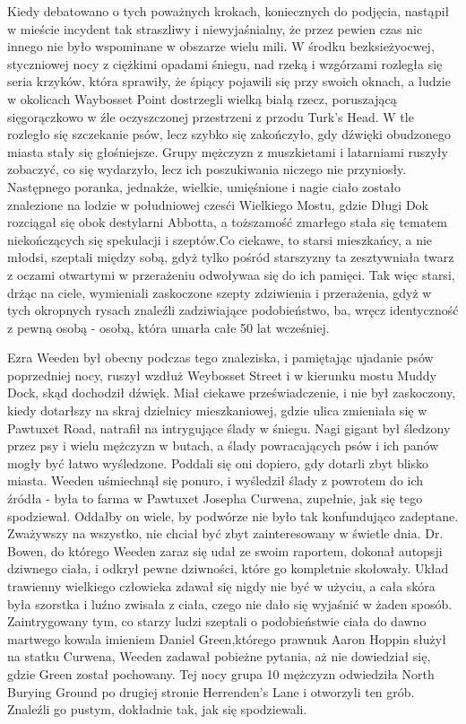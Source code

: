 Kiedy debatowano o tych poważnych krokach, koniecznych do podjęcia, nastąpił w mieście incydent tak straszliwy i niewyjaśnialny, że przez pewien czas nic innego nie było wspominane w obszarze wielu mili. W środku bezksieżyocwej, styczniowej nocy z ciężkimi opadami śniegu, nad rzeką i wzgórzami rozległa się seria krzyków, która sprawiły, że śpiący pojawili się przy swoich oknach, a ludzie w okolicach Waybosset Point dostrzegli wielką białą rzecz, poruszającą sięgorączkowo w źle oczyszczonej przestrzeni z przodu Turk's Head. W tle rozległo się szczekanie psów, lecz szybko się zakończyło, gdy dźwięki obudzonego miasta stały się głośniejsze. Grupy mężczyzn z muszkietami i latarniami ruszyły zobaczyć, co się wydarzyło, lecz ich poszukiwania niczego nie przyniosły. Następnego poranka, jednakże, wielkie, umięśnione i nagie ciało zostało znalezione na lodzie w południowej czesći Wielkiego Mostu, gdzie Długi Dok rozciągał się obok destylarni Abbotta, a toższamość zmarłego stała się tematem niekończących się spekulacji i szeptów.Co ciekawe, to starsi mieszkańcy, a nie młodsi, szeptali między sobą, gdyż tylko pośród starszyzny ta zesztywniała twarz z oczami otwartymi w przerażeniu odwoływaa się do ich pamięci. Tak więc starsi, drżąc na ciele, wymieniali zaskoczone szepty zdziwienia i przerażenia, gdyż w tych okropnych rysach znaleźli zadziwiające podobieństwo, ba, wręcz identyczność z pewną osobą - osobą, która umarła całe 50 lat wcześniej.

Ezra Weeden był obecny podczas tego znaleziska, i pamiętając ujadanie psów poprzedniej nocy, ruszył wzdłuż Weybosset Street i w kierunku mostu Muddy Dock, skąd dochodził dźwięk. Miał ciekawe przeświadczenie, i nie był zaskoczony, kiedy dotarłszy na skraj dzielnicy mieszkaniowej, gdzie ulica zmieniała się w Pawtuxet Road, natrafił na intrygujące ślady w śniegu. Nagi gigant był śledzony przez psy i wielu mężczyzn w butach, a ślady powracających psów i ich panów mogły być łatwo wyśledzone. Poddali się oni dopiero, gdy dotarli zbyt blisko miasta. Weeden uśmiechnął się ponuro, i wyśledził ślady z powrotem do ich źródła - była to farma w Pawtuxet Josepha Curwena, zupełnie, jak się tego spodziewał. Oddałby on wiele, by podwórze nie było tak konfundująco zadeptane. Zważywszy na wszystko, nie chciał być zbyt zainteresowany w świetle dnia. Dr. Bowen, do którego Weeden zaraz się udał ze swoim raportem, dokonał autopsji dziwnego ciała, i odkrył pewne dziwności, które go kompletnie skołowały. Układ trawienny wielkiego człowieka zdawał się nigdy nie być w użyciu, a cała skóra była szorstka i luźno zwisała z ciała, czego nie dało się wyjaśnić w żaden sposób. Zaintrygowany tym, co starzy ludzi szeptali o podobieństwie ciała do dawno martwego kowala imieniem Daniel Green,którego prawnuk Aaron Hoppin służył na statku Curwena, Weeden zadawał pobieżne pytania, aż nie dowiedział się, gdzie Green został pochowany. Tej nocy grupa 10 mężczyzn odwiedziła North Burying Ground po drugiej stronie Herrenden's Lane i otworzyli ten grób. Znaleźli go pustym, dokładnie tak, jak się spodziewali.


